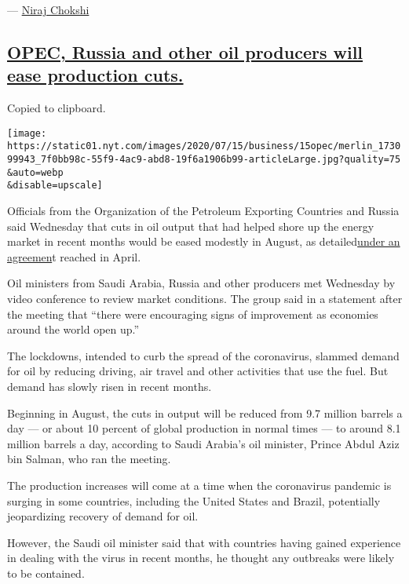 --- \href{https://www.nytimes.com/by/niraj-chokshi}{Niraj Chokshi}

\hypertarget{opec-russia-and-other-oil-producers-will-ease-production-cuts}{%
\subsection{\texorpdfstring{\protect\hyperlink{opec-russia-and-other-oil-producers-will-ease-production-cuts}{OPEC,
Russia and other oil producers will ease production
cuts.}}{OPEC, Russia and other oil producers will ease production cuts.}}\label{opec-russia-and-other-oil-producers-will-ease-production-cuts}}

Copied to clipboard.

\texttt{[image: https://static01.nyt.com/images/2020/07/15/business/15opec/merlin\_173099943\_7f0bb98c-55f9-4ac9-abd8-19f6a1906b99-articleLarge.jpg?quality=75\\\&auto=webp\\\&disable=upscale]}

Officials from the Organization of the Petroleum Exporting Countries and
Russia said Wednesday that cuts in oil output that had helped shore up
the energy market in recent months would be eased modestly in August, as
detailed\href{https://www.nytimes.com/2020/04/09/business/energy-environment/opec-saudiarabia-russia-oil-coronavirus.html}{under
an agreemen}t reached in April.

Oil ministers from Saudi Arabia, Russia and other producers met
Wednesday by video conference to review market conditions. The group
said in a statement after the meeting that ``there were encouraging
signs of improvement as economies around the world open up.''

The lockdowns, intended to curb the spread of the coronavirus, slammed
demand for oil by reducing driving, air travel and other activities that
use the fuel. But demand has slowly risen in recent months.

Beginning in August, the cuts in output will be reduced from 9.7 million
barrels a day --- or about 10 percent of global production in normal
times --- to around 8.1 million barrels a day, according to Saudi
Arabia's oil minister, Prince Abdul Aziz bin Salman, who ran the
meeting.

The production increases will come at a time when the coronavirus
pandemic is surging in some countries, including the United States and
Brazil, potentially jeopardizing recovery of demand for oil.

However, the Saudi oil minister said that with countries having gained
experience in dealing with the virus in recent months, he thought any
outbreaks were likely to be contained.

